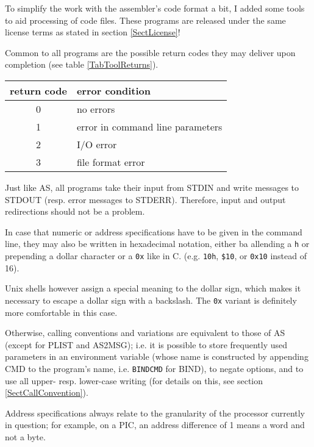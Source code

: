 \documentclass[12pt,twoside]{report}
\newcommand{\tty}[1]{{\tt #1}}
\begin{document}
To simplify the work with the assembler's code format a bit, I added
some tools to aid processing of code files.  These programs are
released under the same license terms as stated in section
\ref{SectLicense}!

Common to all programs are the possible return codes they may deliver
upon completion (see table \ref{TabToolReturns}).
\par
\begin{table*}[h]
\begin{center}\begin{tabular}{|c|l|}
\hline
return code   & error condition \\
\hline
\hline
0             & no errors \\
1             & error in command line parameters \\
2             & I/O error \\
3             & file format error \\
\hline
\end{tabular}\end{center}
\caption{Return Codes of the Utility Programs\label{TabToolReturns}}
\end{table*}
Just like AS, all programs take their input from STDIN and write
messages to STDOUT (resp. error messages to STDERR).  Therefore,
input and output redirections should not be a problem.

In case that numeric or address specifications have to be given in
the command line, they may also be written in hexadecimal
notation,  either ba allending a \verb!h! or prepending a dollar
character or a \tty{0x} like in C.
(e.g. \verb!10h!, \verb!$10!, or \verb!0x10! instead of 16).

Unix shells however  assign a special meaning to the
dollar sign, which makes it necessary to escape a dollar sign with a
backslash.  The \tty{0x} variant is definitely more comfortable in this case.

Otherwise, calling conventions and variations are equivalent to those
of AS (except for PLIST and AS2MSG); i.e. it is possible to store
frequently used parameters in an environment variable (whose name is
constructed by appending CMD to the program's name, i.e. \tty{BINDCMD} for
BIND), to negate options, and to use all upper- resp. lower-case
writing (for details on this, see section \ref{SectCallConvention}).

Address specifications always relate to the granularity of the
processor currently in question; for example, on a PIC, an address
difference of 1 means a word and not a byte.
\end{document}
